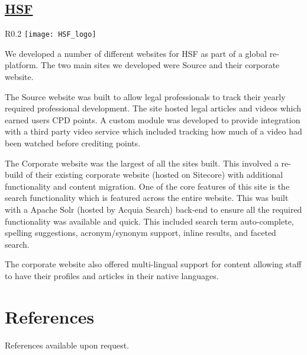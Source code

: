 \documentclass[11pt,a4paper,sans]{moderncv}        %
\begin{document}
  \subsection{\href{https://www.herbertsmithfreehills.com/}{\ac{HSF}}}
    \begin{wrapfigure}{R}{0.2\textwidth}
      \vspace{-10pt}
      \texttt{[image: HSF\_logo]}
      \vspace{-10pt}
    \end{wrapfigure}
    We developed a number of different websites for \ac{HSF} as part of a global re-platform. The two main sites we developed were Source and their corporate website.

    The Source website was built to allow legal professionals to track their yearly required professional development. The site hosted legal articles and videos which earned users \ac{CPD} points. A custom module was developed to provide integration with a third party video service which included tracking how much of a video had been watched before crediting points.

    The Corporate website was the largest of all the sites built. This involved a re-build of their existing corporate website (hosted on Sitecore) with additional functionality and content migration. One of the core features of this site is the search functionality which is featured across the entire website. This was built with a Apache Solr (hosted by Acquia Search) back-end to ensure all the required functionality was available and quick. This included search term auto-complete, spelling suggestions, acronym/synonym support, inline results, and faceted search.

    The corporate website also offered multi-lingual support for content allowing staff to have their profiles and articles in their native languages.


\section{References}
References available upon request.


\end{document}
